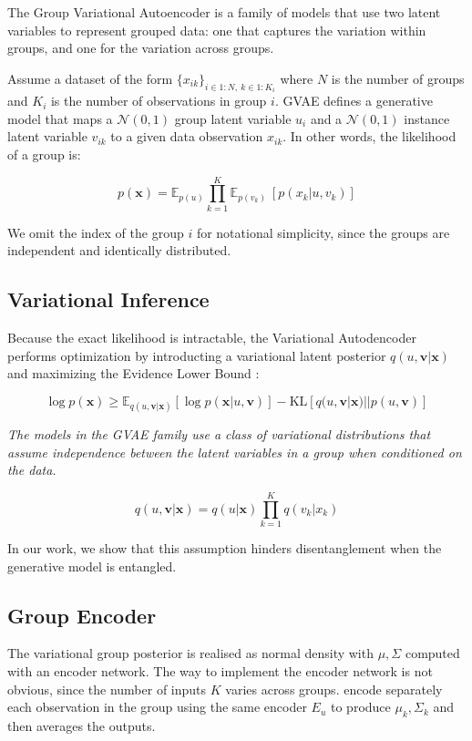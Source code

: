 \documentclass[nohyperref]{article}
\theoremstyle{plain}
\theoremstyle{definition}
\theoremstyle{remark}
\begin{document}
The Group Variational Autoencoder \citep{Bouchacourt2018MultiLevelVA,Hosoya2019GroupbasedLO} is a family of models that use two latent variables to represent grouped data: one that captures the variation within groups, and one for the variation across groups.

Assume a dataset of the form $\{x_{ik}\}_{i \in 1:N, ~k \in 1:K_i}$ where $N$ is the number of groups and $K_i$ is the number of observations in group $i$. GVAE defines a generative model that maps a $\mathcal{N} (0,1)$ group latent variable $u_i$ and a $\mathcal{N} (0,1)$ instance latent variable $v_{ik}$ to a given data observation $x_{ik}$. In other words, the likelihood of a group is:

$$p(\mathbf{x}) = \mathbb{E}_{p(u)}  \prod_{k=1}^{K} \mathbb{E}_{p(v_{k})} ~ [p(x_{k} | u, v_{k})]$$

We omit the index of the group $i$ for notational simplicity, since the groups are independent and identically distributed.

\subsection{Variational Inference}

Because the exact likelihood is intractable, the Variational Autodencoder \citep{Kingma2014AutoEncodingVB,JimenezRezende2014StochasticBA} performs optimization by introducting a variational latent posterior $q(u, \mathbf{v} | \mathbf{x})$ and maximizing the Evidence Lower Bound \citep{Jordan2004AnIT}:

$$\log p(\mathbf{x}) \geq \mathbb{E}_{q(u, \mathbf{v} | \mathbf{x})} [\log p(\mathbf{x} | u, \mathbf{v})] - \mathrm{KL} [q(u, \mathbf{v} | \mathbf{x}) || p(u, \mathbf{v})]$$

\textit{The models in the GVAE family use a class of variational distributions that assume independence between the latent variables in a group when conditioned on the data.}

$$q(u, \mathbf{v} | \mathbf{x}) = q(u | \mathbf{x}) \prod_{k=1}^K q(v_k | x_k)$$

In our work, we show that this assumption hinders disentanglement when the generative model is entangled.

\subsection{Group Encoder}

The variational group posterior is realised as normal density with $\mu, \Sigma$ computed with an encoder network. The way to implement the encoder network is not obvious, since the number of inputs $K$ varies across groups. \citet{Hosoya2019GroupbasedLO} encode separately each observation in the group using the same encoder $E_u$ to produce $\mu_k, \Sigma_k$ and then averages the outputs.
\end{document}
